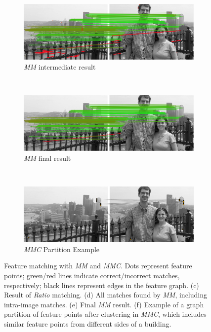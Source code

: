 \begin{figure}[h]
        ~ %
        \begin{subfigure}[t]{0.5\columnwidth}
            \centering
            \includegraphics[width=0.95\columnwidth]{images/mirror_match_with_pruned}
            \caption{\emph{MM} intermediate result}
            \label{fig:within}
        \end{subfigure}%
        \\ %
        \begin{subfigure}[t]{0.5\columnwidth}
            \centering
            \includegraphics[width=0.95\columnwidth]{images/mirror_match}
            \caption{\emph{MM} final result}
            \label{fig:without}
        \end{subfigure}%
        ~ %
        \begin{subfigure}[t]{0.5\columnwidth}
            \centering
            \includegraphics[width=0.95\columnwidth]{images/MMC_partition}
            \caption{\emph{MMC} Partition Example}
            \label{fig:pitts_partition}
        \end{subfigure}%
    \caption{Feature matching with \emph{MM} and \emph{MMC}. Dots 
        represent feature points; green/red lines indicate 
        correct/incorrect matches, respectively; black lines represent 
        edges in the feature graph.  (c) Result of \emph{Ratio} 
        matching.  (d) All matches found by \emph{MM}, including 
        intra-image matches.  (e) Final \emph{MM} result.  (f) Example 
    of a graph partition of feature points after clustering in 
\emph{MMC}, which includes similar feature points from different sides 
of a building.}%
    \label{fig:comparemirror}%
\end{figure}%

